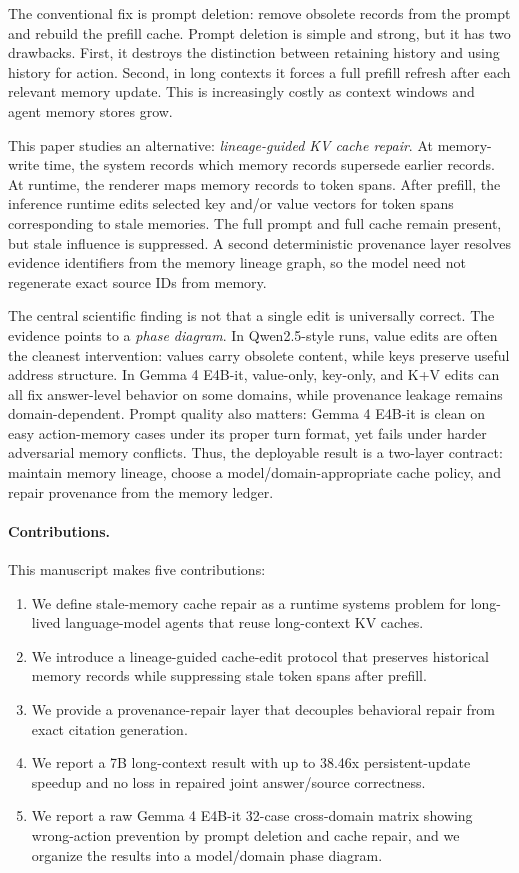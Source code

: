 \documentclass[11pt]{article}
\newcommand{\gemma}{Gemma 4 E4B-it}
\begin{document}
The conventional fix is prompt deletion: remove obsolete records from the
prompt and rebuild the prefill cache. Prompt deletion is simple and strong, but
it has two drawbacks. First, it destroys the distinction between retaining
history and using history for action. Second, in long contexts it forces a full
prefill refresh after each relevant memory update. This is increasingly costly
as context windows and agent memory stores grow.

This paper studies an alternative: \emph{lineage-guided KV cache repair}. At
memory-write time, the system records which memory records supersede earlier
records. At runtime, the renderer maps memory records to token spans. After
prefill, the inference runtime edits selected key and/or value vectors for
token spans corresponding to stale memories. The full prompt and full cache
remain present, but stale influence is suppressed. A second deterministic
provenance layer resolves evidence identifiers from the memory lineage graph,
so the model need not regenerate exact source IDs from memory.

The central scientific finding is not that a single edit is universally
correct. The evidence points to a \emph{phase diagram}. In Qwen2.5-style runs,
value edits are often the cleanest intervention: values carry obsolete content,
while keys preserve useful address structure. In \gemma{}, value-only, key-only,
and K+V edits can all fix answer-level behavior on some domains, while
provenance leakage remains domain-dependent. Prompt quality also matters:
\gemma{} is clean on easy action-memory cases under its proper turn format, yet
fails under harder adversarial memory conflicts. Thus, the deployable result is
a two-layer contract: maintain memory lineage, choose a model/domain-appropriate
cache policy, and repair provenance from the memory ledger.

\paragraph{Contributions.}
This manuscript makes five contributions:
\begin{enumerate}[leftmargin=1.5em]
  \item We define stale-memory cache repair as a runtime systems problem for
  long-lived language-model agents that reuse long-context KV caches.
  \item We introduce a lineage-guided cache-edit protocol that preserves
  historical memory records while suppressing stale token spans after prefill.
  \item We provide a provenance-repair layer that decouples behavioral repair
  from exact citation generation.
  \item We report a 7B long-context result with up to 38.46x persistent-update
  speedup and no loss in repaired joint answer/source correctness.
  \item We report a raw \gemma{} 32-case cross-domain matrix showing
  wrong-action prevention by prompt deletion and cache repair, and we organize
  the results into a model/domain phase diagram.
\end{enumerate}
\end{document}

